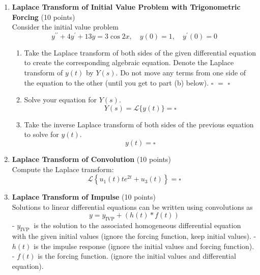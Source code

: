 \begin{enumerate}
  \item \textbf{Laplace Transform of Initial Value Problem with Trigonometric Forcing} (10 points)\\
  Consider the initial value problem
  $$
  y^{\prime \prime}+4 y^{\prime}+13 y=3 \cos 2 x, \quad y(0)=1, \quad y^{\prime}(0)=0
  $$
  \begin{enumerate}[label=(\alph*)]
    \item Take the Laplace transform of both sides of the given differential 
    equation to create the corresponding algebraic equation. Denote the 
    Laplace transform of $y(t)$ by $Y(s)$. Do not move any terms from 
    one side of the equation to the other (until you get to part (b) below).
    $\square$ $=$ $\square$
    \begin{subanswer}
    \end{subanswer}
    \item Solve your equation for $Y(s)$.
    $$
    Y(s)=\mathcal{L}\{y(t)\}=\square
    $$
    \begin{subanswer}
    \end{subanswer}
    \item Take the inverse Laplace transform of both sides of the previous equation to solve for $y(t)$.
    $$
    y(t)=\square
    $$
    \begin{subanswer}
    \end{subanswer}
  \end{enumerate}

  \item \textbf{Laplace Transform of Convolution} (10 points)\\
  Compute the Laplace transform:
  $$
  \mathcal{L}\left\{u_1(t) t e^{2 t}+u_3(t)\right\}=\square
  $$
  \begin{subanswer}
  \end{subanswer}

  \item \textbf{Laplace Transform of Impulse} (10 points)\\
  Solutions to linear differential equations can be written using convolutions as
  $$
  y=y_{\mathrm{IVP}}+(h(t) * f(t))
  $$
  - $y_{\text {IVP }}$ is the solution to the associated homogeneous differential equation with the given initial values
  (ignore the forcing function, keep initial values).
  - $h(t)$ is the impulse response
  (ignore the initial values and forcing function).
  - $f(t)$ is the forcing function.
  (ignore the initial values and differential equation).


\end{enumerate}
